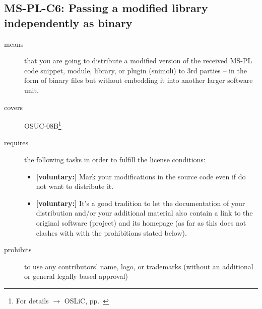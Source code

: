 \subsection{MS-PL-C6: Passing a modified library independently as binary}
\label{OSUC-08B-MS-PL}
\begin{description}
\item[means] that you are going to distribute a modified version of the received
MS-PL code snippet, module, library, or plugin (snimoli) to 3rd parties -- in
the form of binary files but without embedding it into another larger software
unit.
\item[covers] OSUC-08B\footnote{For details $\rightarrow$ OSLiC, pp.\
\pageref{OSUC-08B-DEF}}
\item[requires] the following tasks in order to fulfill the license conditions:

\begin{itemize}
  
  \item \textbf{[voluntary:]} Mark your modifications in the source code even if
  do not want to distribute it.
  
  \item \textbf{[voluntary:]} It's a good tradition to let the documentation of
  your distribution and/or your additional material also contain a link to the
  original software (project) and its homepage (as far as this does not clashes
  with with the prohibitions stated below).
    
\end{itemize}

\item[prohibits] to use any contributors' name, logo, or trademarks (without an
additional or general legally based approval)

\end{description}

